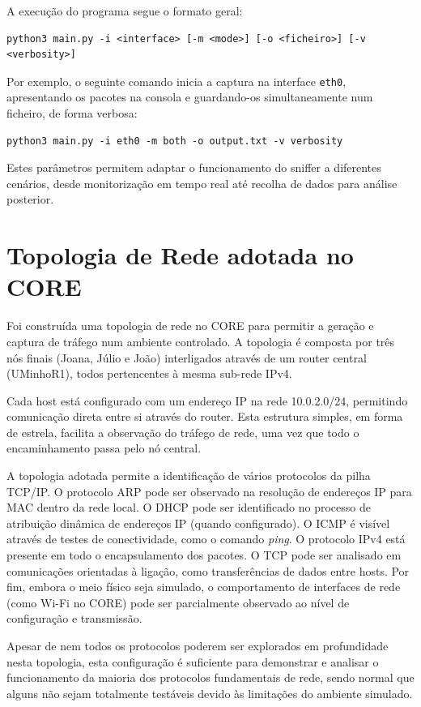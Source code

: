 \documentclass[a4paper,12pt]{article}
\begin{document}
A execução do programa segue o formato geral:

\begin{verbatim}
python3 main.py -i <interface> [-m <mode>] [-o <ficheiro>] [-v <verbosity>]
\end{verbatim}

Por exemplo, o seguinte comando inicia a captura na interface \texttt{eth0}, apresentando os pacotes na consola e guardando-os simultaneamente num ficheiro, de forma verbosa:

\begin{verbatim}
python3 main.py -i eth0 -m both -o output.txt -v verbosity
\end{verbatim}

Estes parâmetros permitem adaptar o funcionamento do sniffer a diferentes cenários, desde monitorização em tempo real até recolha de dados para análise posterior.

\section{Topologia de Rede adotada no CORE}

Foi construída uma topologia de rede no CORE para permitir a geração e captura de tráfego num ambiente controlado. A topologia é composta por três nós finais (Joana, Júlio e João) interligados através de um router central (UMinhoR1), todos pertencentes à mesma sub-rede IPv4.

Cada host está configurado com um endereço IP na rede 10.0.2.0/24, permitindo comunicação direta entre si através do router. Esta estrutura simples, em forma de estrela, facilita a observação do tráfego de rede, uma vez que todo o encaminhamento passa pelo nó central.

A topologia adotada permite a identificação de vários protocolos da pilha TCP/IP. O protocolo ARP pode ser observado na resolução de endereços IP para MAC dentro da rede local. O DHCP pode ser identificado no processo de atribuição dinâmica de endereços IP (quando configurado). O ICMP é visível através de testes de conectividade, como o comando \textit{ping}. O protocolo IPv4 está presente em todo o encapsulamento dos pacotes. O TCP pode ser analisado em comunicações orientadas à ligação, como transferências de dados entre hosts. Por fim, embora o meio físico seja simulado, o comportamento de interfaces de rede (como Wi-Fi no CORE) pode ser parcialmente observado ao nível de configuração e transmissão.

Apesar de nem todos os protocolos poderem ser explorados em profundidade nesta topologia, esta configuração é suficiente para demonstrar e analisar o funcionamento da maioria dos protocolos fundamentais de rede, sendo normal que alguns não sejam totalmente testáveis devido às limitações do ambiente simulado.
\end{document}
